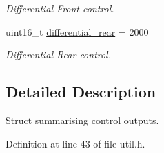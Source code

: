 \begin{DoxyCompactItemize}
\begin{DoxyCompactList}\small\item\em Differential Front control. \end{DoxyCompactList}\item 
uint16\+\_\+t \hyperlink{structSPMB_1_1util_1_1control_a07e85f5ccd5c59ce1d7de56c82b089f2}{differential\+\_\+rear} = 2000\hypertarget{structSPMB_1_1util_1_1control_a07e85f5ccd5c59ce1d7de56c82b089f2}{}\label{structSPMB_1_1util_1_1control_a07e85f5ccd5c59ce1d7de56c82b089f2}

\begin{DoxyCompactList}\small\item\em Differential Rear control. \end{DoxyCompactList}\end{DoxyCompactItemize}


\subsection{Detailed Description}
Struct summarising control outputs. 

Definition at line 43 of file util.\+h.

